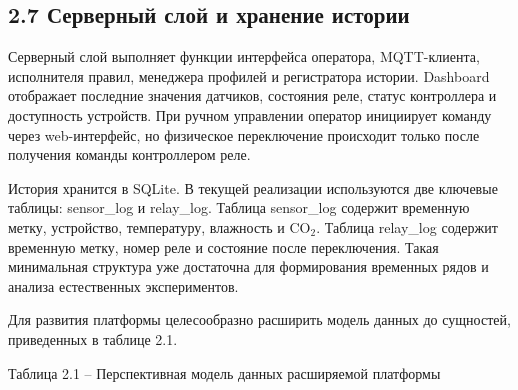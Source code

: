 \documentclass[a4paper,14pt]{extarticle}
\renewcommand{\texttt}[1]{\textnormal{#1}}
\begin{document}
\hypertarget{ux441ux435ux440ux432ux435ux440ux43dux44bux439-ux441ux43bux43eux439-ux438-ux445ux440ux430ux43dux435ux43dux438ux435-ux438ux441ux442ux43eux440ux438ux438}{%
\subsection{2.7 Серверный слой и хранение
истории}\label{ux441ux435ux440ux432ux435ux440ux43dux44bux439-ux441ux43bux43eux439-ux438-ux445ux440ux430ux43dux435ux43dux438ux435-ux438ux441ux442ux43eux440ux438ux438}}

Серверный слой выполняет функции интерфейса оператора, MQTT-клиента,
исполнителя правил, менеджера профилей и регистратора истории. Dashboard
отображает последние значения датчиков, состояния реле, статус
контроллера и доступность устройств. При ручном управлении оператор
инициирует команду через web-интерфейс, но физическое переключение
происходит только после получения команды контроллером реле.

История хранится в SQLite. В текущей реализации используются две
ключевые таблицы: \texttt{sensor\_log} и \texttt{relay\_log}. Таблица
\texttt{sensor\_log} содержит временную метку, устройство, температуру,
влажность и CO\(_2\). Таблица \texttt{relay\_log} содержит временную
метку, номер реле и состояние после переключения. Такая минимальная
структура уже достаточна для формирования временных рядов и анализа
естественных экспериментов.

Для развития платформы целесообразно расширить модель данных до
сущностей, приведенных в таблице 2.1.

Таблица 2.1 -- Перспективная модель данных расширяемой платформы
\end{document}
